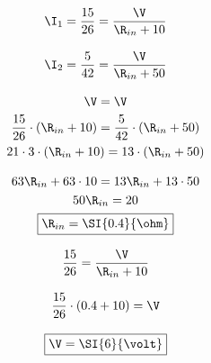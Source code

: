 \documentclass{ipaexam}
\begin{document}
\begin{questions}
\begin{solution}
	\begin{minipage}[c]{0.5\linewidth}
		\begin{gather*}
			\I_1=\dfrac{15}{26}=\dfrac{\V}{\R_{in}{}+10}\\[2ex]
			\I_2=\dfrac{5}{42}=\dfrac{\V}{\R_{in}{}+50}\\[2ex]
			\V=\V\\
			\dfrac{15}{26}\cdot\left(\R_{in}{}+10\right)=\dfrac{5}{42}\cdot\left(\R_{in}{}+50\right)\\
			21\cdot3\cdot\left(\R_{in}{}+10\right)=13\cdot\left(\R_{in}{}+50\right)\\[2ex]
			63\R_{in}{}+63\cdot10=13\R_{in}{}+13\cdot50\\
			50\R_{in}=20\\
			\boxed{\R_{in}=\SI{0.4}{\ohm}}
		\end{gather*}
	\end{minipage}
	\begin{minipage}[c]{0.5\linewidth}
		\begin{gather*}
			\dfrac{15}{26}=\dfrac{\V}{\R_{in}{}+10}\\[2ex]
			\dfrac{15}{26}\cdot\left(0.4+10\right)=\V\\[2ex]
			\boxed{\V=\SI{6}{\volt}}
		\end{gather*}
	\end{minipage}
\end{solution}

\end{questions}
\end{document}

